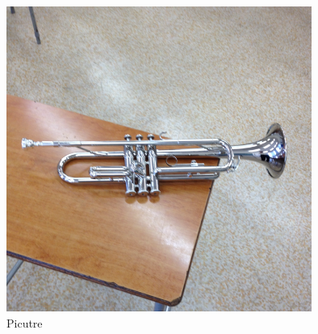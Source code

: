 \documentclass[dvipdfmx,12pt]{ujarticle}
\begin{document}
\begin{figure}[ht]
    \centering
    \includegraphics[width=10cm]{trp.png}
    \caption{Picutre}
    \label{SampleFigure}
\end{figure}
\end{document}
